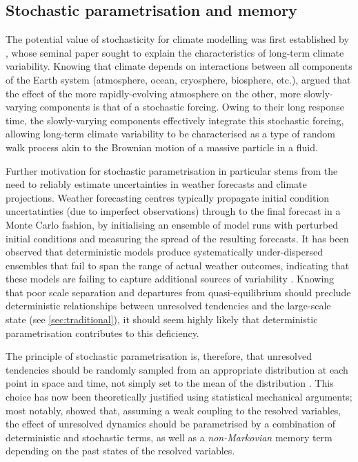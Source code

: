 \documentclass[titlepage,twoside]{article}
\numberwithin{equation}{section}
\begin{document}
\subsection{Stochastic parametrisation and memory}
The potential value of stochasticity for climate modelling was first
established by \textcite{hasselmann1976}, whose seminal paper sought to explain
the characteristics of long-term climate variability. Knowing that climate
depends on interactions between all components of the Earth system
(atmosphere, ocean, cryosphere, biosphere, etc.), \citeauthor{hasselmann1976}
argued that the effect of the more rapidly-evolving atmosphere on the other,
more slowly-varying components is that of a stochastic forcing. Owing to
their long response time, the slowly-varying components effectively integrate
this stochastic forcing, allowing long-term climate variability to be
characterised as a type of random walk process akin to the Brownian motion
of a massive particle in a fluid.

Further motivation for stochastic parametrisation in particular stems from the
need to reliably estimate uncertainties in weather forecasts and climate
projections. Weather forecasting centres typically propagate initial condition
uncertatinties (due to imperfect observations) through to the final forecast in
a Monte Carlo fashion, by initialising an ensemble of model runs with perturbed
initial conditions and measuring the spread of the resulting forecasts. It has
been observed that deterministic models produce systematically under-dispersed
ensembles that fail to span the range of actual weather outcomes, indicating
that these models are failing to capture additional sources of variability
\parencite{palmer2005,berner2017,palmer2019}. Knowing that poor scale
separation and departures from quasi-equilibrium should preclude deterministic
relationships between unresolved tendencies and the large-scale state (see
\cref{sec:traditional}), it should seem highly likely that deterministic
parametrisation contributes to this deficiency.

The principle of stochastic parametrisation is, therefore, that unresolved
tendencies should be randomly sampled from an appropriate distribution at each
point in space and time, not simply set to the mean of the distribution
\parencite{franzke2015}. This choice has now been theoretically justified using
statistical mechanical arguments; most notably,
\textcite{wouters2012,wouters2013} showed that, assuming a weak coupling to the
resolved variables, the effect of unresolved dynamics should be parametrised by
a combination of deterministic and stochastic terms, as well as a
\emph{non-Markovian} memory term depending on the past states of the resolved
variables.
\end{document}
